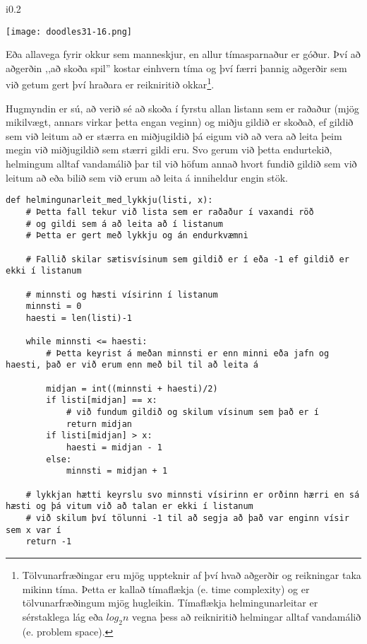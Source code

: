\begin{wrapfigure}{i}{0.2\textwidth} %
\begin{center}
	\texttt{[image: doodles31-16.png]}
\end{center}
\end{wrapfigure}
Eða allavega fyrir okkur sem manneskjur, en allur tímasparnaður er góður.
Því að aðgerðin ,,að skoða spil'' kostar einhvern tíma og því færri þannig aðgerðir sem við getum gert því hraðara er reikniritið okkar\footnote{Tölvunarfræðingar eru mjög uppteknir af því hvað aðgerðir og reikningar taka mikinn tíma.
	Þetta er kallað tímaflækja (e. time complexity) og er tölvunarfræðingum mjög hugleikin.
	Tímaflækja helmingunarleitar er sérstaklega lág eða $log_2{n}$ vegna þess að reikniritið helmingar alltaf vandamálið (e. problem space).}.

Hugmyndin er sú, að verið sé að skoða í fyrstu allan listann sem er raðaður (mjög mikilvægt, annars virkar þetta engan veginn) og miðju gildið er skoðað, ef gildið sem við leitum að er stærra en miðjugildið þá eigum við að vera að leita þeim megin við miðjugildið sem stærri gildi eru.
Svo gerum við þetta endurtekið, helmingum alltaf vandamálið þar til við höfum annað hvort fundið gildið sem við leitum að eða bilið sem við erum að leita á inniheldur engin stök.


\begin{lstlisting}[caption=Helmingunarleit að tölu í röðuðum lista með lykkju, label=lst:reiknirit-helm-for]
	def helmingunarleit_med_lykkju(listi, x):
	# Þetta fall tekur við lista sem er raðaður í vaxandi röð
	# og gildi sem á að leita að í listanum
	# Þetta er gert með lykkju og án endurkvæmni
	
	# Fallið skilar sætisvísinum sem gildið er í eða -1 ef gildið er ekki í listanum
	
	# minnsti og hæsti vísirinn í listanum
	minnsti = 0
	haesti = len(listi)-1
	
	while minnsti <= haesti:
		# Þetta keyrist á meðan minnsti er enn minni eða jafn og haesti, það er við erum enn með bil til að leita á
	
		midjan = int((minnsti + haesti)/2)
		if listi[midjan] == x:
			# við fundum gildið og skilum vísinum sem það er í
			return midjan
		if listi[midjan] > x:
			haesti = midjan - 1
		else:
			minnsti = midjan + 1
	
	# lykkjan hætti keyrslu svo minnsti vísirinn er orðinn hærri en sá hæsti og þá vitum við að talan er ekki í listanum 
	# við skilum því tölunni -1 til að segja að það var enginn vísir sem x var í
	return -1
\end{lstlisting}

